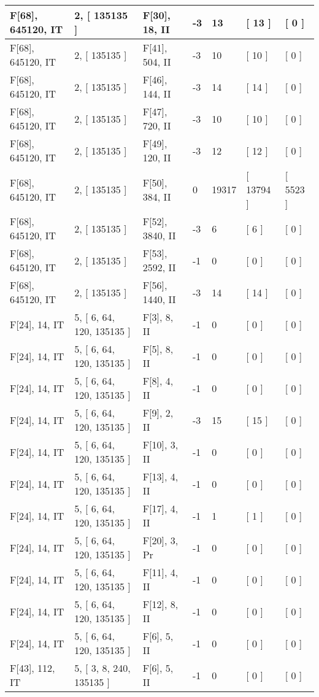 \documentclass[9 pt]{scrartcl}
\begin{document}
\begin{longtable}{ |p{3em}|p{6em}|p{3em}|p{2em}|p{2em}|p{6em}|p{6em}| }
F[68], 645120, IT &2, [ 135135 ] & F[30], 18, II  & -3 & 13 & [ 13 ] & [ 0 ]\\ \hline
F[68], 645120, IT &2, [ 135135 ] & F[41], 504, II  & -3 & 10 & [ 10 ] & [ 0 ]\\ \hline
F[68], 645120, IT &2, [ 135135 ] & F[46], 144, II  & -3 & 14 & [ 14 ] & [ 0 ]\\ \hline
F[68], 645120, IT &2, [ 135135 ] & F[47], 720, II  & -3 & 10 & [ 10 ] & [ 0 ]\\ \hline
F[68], 645120, IT &2, [ 135135 ] & F[49], 120, II  & -3 & 12 & [ 12 ] & [ 0 ]\\ \hline
F[68], 645120, IT &2, [ 135135 ] & F[50], 384, II  & 0 & 19317 & [ 13794 ] & [ 5523 ]\\ \hline
F[68], 645120, IT &2, [ 135135 ] & F[52], 3840, II  & -3 & 6 & [ 6 ] & [ 0 ]\\ \hline
F[68], 645120, IT &2, [ 135135 ] & F[53], 2592, II  & -1 & 0 & [ 0 ] & [ 0 ]\\ \hline
F[68], 645120, IT &2, [ 135135 ] & F[56], 1440, II  & -3 & 14 & [ 14 ] & [ 0 ]\\ \hline
F[24], 14, IT &5, [ 6, 64, 120, 135135 ] & F[3], 8, II  & -1 & 0 & [ 0 ] & [ 0 ]\\ \hline
F[24], 14, IT &5, [ 6, 64, 120, 135135 ] & F[5], 8, II  & -1 & 0 & [ 0 ] & [ 0 ]\\ \hline
F[24], 14, IT &5, [ 6, 64, 120, 135135 ] & F[8], 4, II  & -1 & 0 & [ 0 ] & [ 0 ]\\ \hline
F[24], 14, IT &5, [ 6, 64, 120, 135135 ] & F[9], 2, II  & -3 & 15 & [ 15 ] & [ 0 ]\\ \hline
F[24], 14, IT &5, [ 6, 64, 120, 135135 ] & F[10], 3, II  & -1 & 0 & [ 0 ] & [ 0 ]\\ \hline
F[24], 14, IT &5, [ 6, 64, 120, 135135 ] & F[13], 4, II  & -1 & 0 & [ 0 ] & [ 0 ]\\ \hline
F[24], 14, IT &5, [ 6, 64, 120, 135135 ] & F[17], 4, II  & -1 & 1 & [ 1 ] & [ 0 ]\\ \hline
F[24], 14, IT &5, [ 6, 64, 120, 135135 ] & F[20], 3, Pr  & -1 & 0 & [ 0 ] & [ 0 ]\\ \hline
F[24], 14, IT &5, [ 6, 64, 120, 135135 ] & F[11], 4, II  & -1 & 0 & [ 0 ] & [ 0 ]\\ \hline
F[24], 14, IT &5, [ 6, 64, 120, 135135 ] & F[12], 8, II  & -1 & 0 & [ 0 ] & [ 0 ]\\ \hline
F[24], 14, IT &5, [ 6, 64, 120, 135135 ] & F[6], 5, II  & -1 & 0 & [ 0 ] & [ 0 ]\\ \hline
F[43], 112, IT &5, [ 3, 8, 240, 135135 ] & F[6], 5, II  & -1 & 0 & [ 0 ] & [ 0 ]\\ \hline

\end{longtable}
\end{document}
